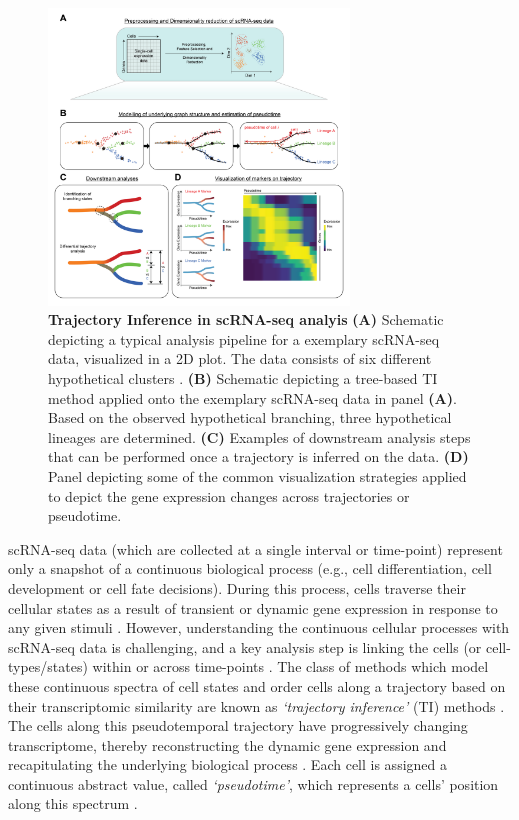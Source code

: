 \begin{figure}
\includegraphics[width=8cm]{Chapter1/Fig/F1-4-01.png}
\caption[sec1-4tpi]{\textbf{Trajectory Inference in scRNA-seq analyis} \textbf{(A)} Schematic depicting a typical analysis pipeline for a exemplary scRNA-seq data, visualized in a 2D plot. The data consists of six different hypothetical clusters . \textbf{(B)} Schematic depicting a tree-based TI method applied onto the exemplary scRNA-seq data in panel \textbf{(A)}. Based on the observed hypothetical branching, three hypothetical lineages are determined. \textbf{(C)} Examples of downstream analysis steps that can be performed once a trajectory is inferred on the data. \textbf{(D)} Panel depicting some of the common visualization strategies applied to depict the gene expression changes across trajectories or pseudotime.}
\label{fig1-4}
\end{figure}

scRNA-seq data (which are collected at a single interval or time-point) represent only a snapshot of a continuous biological process (e.g., cell differentiation, cell development or cell fate decisions). During this process, cells traverse their cellular states as a result of transient or dynamic gene expression in response to any given stimuli \textbf{\cite{zeng_what_2022}}. However, understanding the continuous cellular processes with scRNA-seq data is challenging, and a key analysis step is linking the cells (or cell-types/states) within or across time-points \textbf{\cite{heumos_best_2023}}. The class of methods which model these continuous spectra of cell states and order cells along a trajectory based on their transcriptomic similarity are known as \textit{`trajectory inference’} (TI) methods \textbf{\cite{heumos_best_2023,weiler_guide_2022}}. The cells along this pseudotemporal trajectory have progressively changing transcriptome, thereby reconstructing the dynamic gene expression and recapitulating the underlying biological process \textbf{\cite{hou_statistical_2023}}. Each cell is assigned a continuous abstract value, called \textit{`pseudotime'}, which represents a cells’ position along this spectrum \textbf{\cite{lueckenmalte_d_current_2019,heumos_best_2023}}.\\

